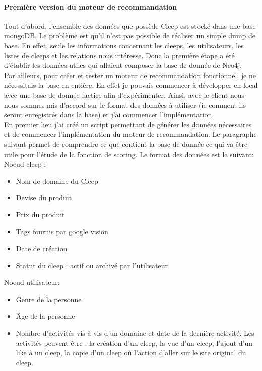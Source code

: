 \documentclass{article} %
\begin{document}
\paragraph{Première version du moteur de recommandation\\}
Tout d'abord, l'ensemble des données que possède Cleep est stocké dans une base mongoDB. Le problème est qu'il n'est pas possible de réaliser un simple dump de base. En effet, seule les informations concernant les cleeps, les utilisateurs, les listes de cleeps et les relations nous intéresse. Donc la première étape a été d'établir les données utiles qui allaient composer la base de donnée de Neo4j.\\
Par ailleurs, pour créer et tester un moteur de recommandation fonctionnel, je ne nécessitais la base en entière. En effet je pouvais commencer à développer en local avec une base de donnée factice afin d'expérimenter. Ainsi, avec le client nous nous sommes mis d'accord sur le format des données à utiliser (ie comment ils seront enregistrés dans la base) et j'ai commencer l'implémentation.\\
En premier lieu j'ai créé un script permettant de générer les données nécessaires et de commencer l'implémentation du moteur de recommandation. Le paragraphe suivant permet de comprendre ce que contient la base de donnée ce qui va être utile pour l'étude de la fonction de scoring. Le format des données est le suivant:\\
Noeud cleep :
\begin{itemize}
	\item Nom de domaine du Cleep
	\item Devise du produit
	\item Prix du produit
	\item Tags fournis par google vision
	\item Date de création
	\item Statut du cleep : actif ou archivé par l'utilisateur
\end{itemize}

Noeud utilisateur:
\begin{itemize}
	\item Genre de la personne
	\item Âge de la personne
	\item Nombre d'activités vis à vis d'un domaine et date de la dernière activité. Les activités peuvent être : la création d'un cleep, la vue d'un cleep, l'ajout d'un like à un cleep, la copie d'un cleep où l'action d'aller sur le site original du cleep. 
\end{itemize}
\end{document}
